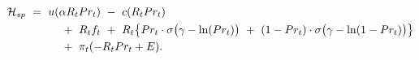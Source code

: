 \begin{equation}
\begin{split}
    \mathcal{H}_{sp} \ 
    & = \ u(\alpha R_{t} Pr_{t}) \ - \ c(R_{t} Pr_{t}) \\
    & \hspace{1.0cm} + \ R_{t} f_{t} \ + \ R_{t} \big\{ Pr_{t} \cdot \sigma \big( \gamma - \ln(Pr_{t}) \big) \ + \ (1 - Pr_{t}) \cdot \sigma \big( \gamma - \ln( 1 - Pr_{t}) \big) \big\} \\
    & \hspace{1.0cm} + \ \pi_{t} (-R_{t}Pr_{t} + E).
\end{split}
\label{Equation:Social-Planners-Problem_Hamiltonian-Lagrangian}
\end{equation}